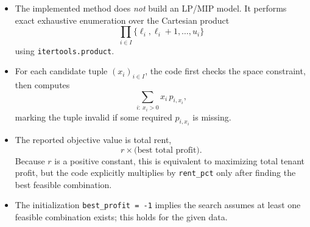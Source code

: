 \begin{itemize}
    \item The implemented method does \emph{not} build an LP/MIP model. It performs exact exhaustive enumeration over the Cartesian product
    \[
    \prod_{i\in I} \{\ell_i,\ell_i+1,\dots,u_i\}
    \]
    using \texttt{itertools.product}.
    \item For each candidate tuple $(x_i)_{i\in I}$, the code first checks the space constraint, then computes
    \[
    \sum_{i:\ x_i>0} x_i\,p_{i,x_i},
    \]
    marking the tuple invalid if some required $p_{i,x_i}$ is missing.
    \item The reported objective value is total rent,
    \[
    r \times \text{(best total profit)}.
    \]
    Because $r$ is a positive constant, this is equivalent to maximizing total tenant profit, but the code explicitly multiplies by \texttt{rent\_pct} only after finding the best feasible combination.
    \item The initialization \texttt{best\_profit = -1} implies the search assumes at least one feasible combination exists; this holds for the given data.
\end{itemize}
